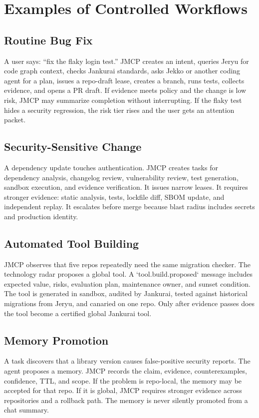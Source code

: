 \documentclass[journal,onecolumn]{IEEEtran}
\begin{document}
\section{Examples of Controlled Workflows}
\subsection{Routine Bug Fix}
A user says: ``fix the flaky login test.'' JMCP creates an intent, queries Jeryu for code graph context, checks Jankurai standards, asks Jekko or another coding agent for a plan, issues a repo-draft lease, creates a branch, runs tests, collects evidence, and opens a PR draft. If evidence meets policy and the change is low risk, JMCP may summarize completion without interrupting. If the flaky test hides a security regression, the risk tier rises and the user gets an attention packet.

\subsection{Security-Sensitive Change}
A dependency update touches authentication. JMCP creates tasks for dependency analysis, changelog review, vulnerability review, test generation, sandbox execution, and evidence verification. It issues narrow leases. It requires stronger evidence: static analysis, tests, lockfile diff, SBOM update, and independent replay. It escalates before merge because blast radius includes secrets and production identity.

\subsection{Automated Tool Building}
JMCP observes that five repos repeatedly need the same migration checker. The technology radar proposes a global tool. A `tool.build.proposed` message includes expected value, risks, evaluation plan, maintenance owner, and sunset condition. The tool is generated in sandbox, audited by Jankurai, tested against historical migrations from Jeryu, and canaried on one repo. Only after evidence passes does the tool become a certified global Jankurai tool.

\subsection{Memory Promotion}
A task discovers that a library version causes false-positive security reports. The agent proposes a memory. JMCP records the claim, evidence, counterexamples, confidence, TTL, and scope. If the problem is repo-local, the memory may be accepted for that repo. If it is global, JMCP requires stronger evidence across repositories and a rollback path. The memory is never silently promoted from a chat summary.
\end{document}
